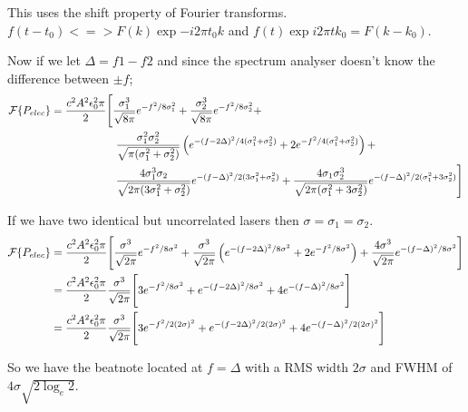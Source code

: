 This uses the shift property of Fourier transforms. $f(t-t_0) <=> F(k)\exp{-i2\pi t_0 k}$ and $f(t)\exp{i2\pi t k_0} = F(k-k_0)$.

Now if we let $\Delta=f1-f2$ and since the spectrum analyser doesn't know the difference between $\pm f$;
\begin{align}
\mathcal{F}\{P_{elec}\} &= \frac{c^2A^2\epsilon_0^2 \pi}{2}\Bigg[\frac{\sigma_1^3}{\sqrt{8\pi}} e^{-f^2/8\sigma_1^2} + \frac{\sigma_2^3}{\sqrt{8\pi}} e^{-f^2/8\sigma_2^2} + \notag\\
&\quad\quad\quad\quad\quad\quad \frac{\sigma_1^2\sigma_2^2}{\sqrt{\pi(\sigma_1^2+\sigma_2^2)}}\left(e^{-(f-2\Delta)^2/4(\sigma_1^2+\sigma_2^2)} + 2e^{-f^2/4(\sigma_1^2+\sigma_2^2)} \right) +\notag\\
&\quad\quad\quad\quad\quad\quad  \frac{4\sigma_1^3\sigma_2}{\sqrt{2\pi(3\sigma_1^2+\sigma_2^2)}}e^{-(f-\Delta)^2/2(3\sigma_1^2+\sigma_2^2)}+\frac{4\sigma_1\sigma_2^3}{\sqrt{2\pi(\sigma_1^2+3\sigma_2^2)}}e^{-(f-\Delta)^2/2(\sigma_1^2+3\sigma_2^2)}\Bigg]
\end{align}

If we have two identical but uncorrelated lasers then $\sigma=\sigma_1=\sigma_2$.
\begin{align}
\mathcal{F}\{P_{elec}\} &= \frac{c^2A^2\epsilon_0^2 \pi}{2}\Bigg[\frac{\sigma^3}{\sqrt{2\pi}} e^{-f^2/8\sigma^2} + \frac{\sigma^3}{\sqrt{2\pi}}\left(e^{-(f-2\Delta)^2/8\sigma^2} + 2e^{-f^2/8\sigma^2} \right) + \frac{4\sigma^3}{\sqrt{2\pi}}e^{-(f-\Delta)^2/8\sigma^2}\Bigg]\notag\\
&= \frac{c^2A^2\epsilon_0^2 \pi}{2}\frac{\sigma^3}{\sqrt{2\pi}}\Bigg[3e^{-f^2/8\sigma^2} + e^{-(f-2\Delta)^2/8\sigma^2} + 4e^{-(f-\Delta)^2/8\sigma^2}\Bigg]\notag\\
&= \frac{c^2A^2\epsilon_0^2 \pi}{2}\frac{\sigma^3}{\sqrt{2\pi}}\Bigg[3e^{-f^2/2(2\sigma)^2} + e^{-(f-2\Delta)^2/2(2\sigma)^2} + 4e^{-(f-\Delta)^2/2(2\sigma)^2}\Bigg]
\end{align}

So we have the beatnote located at $f=\Delta$ with a RMS width $2\sigma$ and FWHM of $4\sigma\sqrt{2\log_e{2}}$.
